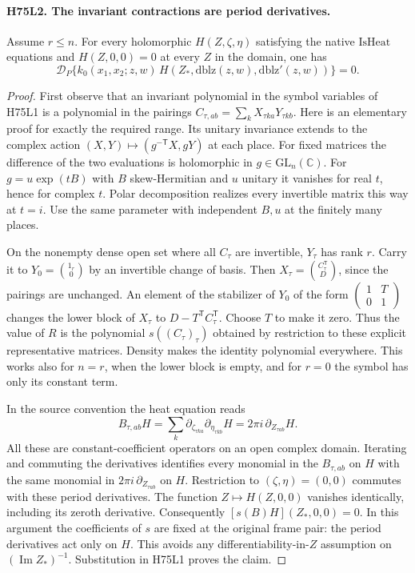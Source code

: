 \paragraph{H75L2. The invariant contractions are period derivatives.}
\label{claim:H75L2}
Assume $r\le n$. For every holomorphic $H(Z,\zeta,\eta)$
satisfying the native $\mathrm{IsHeat}$ equations and
$H(Z,0,0)=0$ at every $Z$ in the domain, one has
\[
 \mathcal D_P\{k_0(x_1,x_2;z,w)\,
  H(Z_*,\mathrm{dblz}(z,w),\mathrm{dblz}'(z,w))\}=0 .
\]

\begin{proof}
First observe that an invariant polynomial in the symbol variables
of H75L1 is a polynomial in the pairings
$C_{\tau,ab}=\sum_k X_{\tau ka}Y_{\tau kb}$. Here is an
elementary proof for exactly the required range. Its unitary
invariance extends to the complex action
$(X,Y)\mapsto(g^{-\mathsf T}X,gY)$ at each place. For fixed
matrices the difference of the two evaluations is holomorphic in
$g\in\mathrm{GL}_n(\mathbb C)$. For $g=u\exp(tB)$ with
$B$ skew-Hermitian and $u$ unitary it vanishes for real $t$,
hence for complex $t$. Polar decomposition realizes every
invertible matrix this way at $t=i$. Use the same parameter
with independent $B,u$ at the finitely many places.

On the nonempty dense open set where all $C_\tau$ are invertible,
$Y_\tau$ has rank $r$. Carry it to
$Y_0=\binom{1_r}{0}$ by an invertible change of basis. Then
$X_\tau=\binom{C_\tau^{\mathsf T}}{D}$, since the pairings
are unchanged. An element of the stabilizer of $Y_0$ of the form
$\left(\begin{smallmatrix}1&T\\0&1\end{smallmatrix}\right)$
changes the lower block of $X_\tau$ to
$D-T^{\mathsf T}C_\tau^{\mathsf T}$. Choose $T$ to make it zero.
Thus the value of $R$ is the polynomial $s((C_\tau)_\tau)$
obtained by restriction to these explicit representative matrices.
Density makes the identity polynomial everywhere. This works also
for $n=r$, when the lower block is empty, and for $r=0$ the
symbol has only its constant term.

In the source convention the heat equation reads
\[
 B_{\tau,ab}H=
 \sum_k\partial_{\zeta_{\tau ka}}\partial_{\eta_{\tau kb}}H
 =2\pi i\,\partial_{Z_{\tau ab}}H.
\]
All these are constant-coefficient operators on an open complex
domain. Iterating and commuting the derivatives identifies every
monomial in the $B_{\tau,ab}$ on $H$ with the same monomial in
$2\pi i\,\partial_{Z_{\tau ab}}$ on $H$. Restriction to
$(\zeta,\eta)=(0,0)$ commutes with these period derivatives.
The function $Z\mapsto H(Z,0,0)$ vanishes identically, including
its zeroth derivative. Consequently
$[s(B)H](Z_*,0,0)=0$. In this argument the coefficients of $s$
are fixed at the original frame pair: the period derivatives act
only on $H$. This avoids any differentiability-in-$Z$ assumption
on $(\operatorname{Im}Z_*)^{-1}$. Substitution in H75L1 proves the
claim.


\end{proof}
